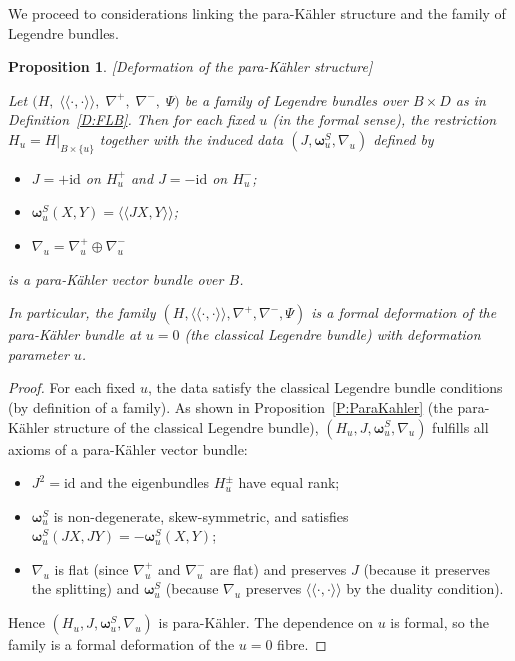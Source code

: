 \documentclass[12pt]{amsart}
\newtheorem{prop}{Proposition}
\begin{document}
\smallskip 


We proceed to considerations linking the para-Kähler structure and the family of Legendre bundles. 

\smallskip 

\begin{prop}\label{P:FamilyParaKahler}[Deformation of the para-Kähler structure]~


    Let $\bigl( H,\; \langle\!\langle\cdot,\cdot\rangle\!\rangle,\; \nabla^+,\; \nabla^-,\; \Psi \bigr)$ be a family of Legendre bundles over $B\times D$ as in Definition~\ref{D:FLB}. Then for each fixed $u$ (in the formal sense), the restriction $H_u = H|_{B\times\{u\}}$ together with the induced data $(J,\boldsymbol{\omega}^S_u,\nabla_u)$ defined by  

\begin{itemize}
    \item $J = +\mathrm{id}$ on $H^+_u$ and $J = -\mathrm{id}$ on $H^-_u$;  
    \item $\boldsymbol{\omega}^S_u(X,Y) = \langle\!\langle JX, Y\rangle\!\rangle$;  
    \item $\nabla_u = \nabla^+_u \oplus \nabla^-_u$
\end{itemize}  

is a \emph{para-Kähler vector bundle} over $B$.  

In particular, the family $(H,\langle\!\langle\cdot,\cdot\rangle\!\rangle,\nabla^+,\nabla^-,\Psi)$ is a \emph{formal deformation} of the para-Kähler bundle at $u=0$ (the classical Legendre bundle) with deformation parameter $u$.  
\end{prop}
   
\begin{proof}
    
For each fixed $u$, the data satisfy the classical Legendre bundle conditions (by definition of a family). As shown in Proposition~\ref{P:ParaKahler} (the para-Kähler structure of the classical Legendre bundle), $(H_u,J,\boldsymbol{\omega}^S_u,\nabla_u)$ fulfills all axioms of a para-Kähler vector bundle:  
\begin{itemize}
    \item $J^2 = \mathrm{id}$ and the eigenbundles $H^\pm_u$ have equal rank;  
    \item $\boldsymbol{\omega}^S_u$ is non-degenerate, skew-symmetric, and satisfies $\boldsymbol{\omega}^S_u(JX,JY)=-\boldsymbol{\omega}^S_u(X,Y)$;  
    \item $\nabla_u$ is flat (since $\nabla^+_u$ and $\nabla^-_u$ are flat) and preserves $J$ (because it preserves the splitting) and $\boldsymbol{\omega}^S_u$ (because $\nabla_u$ preserves $\langle\!\langle\cdot,\cdot\rangle\!\rangle$ by the duality condition).
\end{itemize}  

Hence $(H_u,J,\boldsymbol{\omega}^S_u,\nabla_u)$ is para-Kähler. The dependence on $u$ is formal, so the family is a formal deformation of the $u=0$ fibre.
\end{proof}
\end{document}
